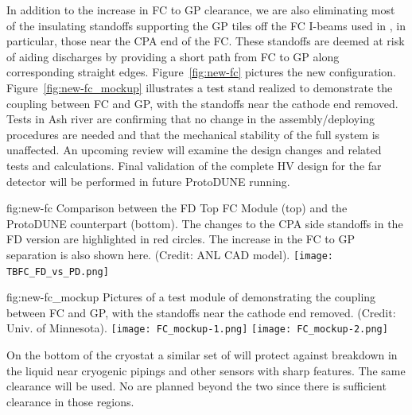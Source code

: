 In addition to the increase in FC to GP clearance, we are also eliminating most of the insulating standoffs supporting the GP tiles off the FC I-beams used in , in particular, those near the CPA end of the FC.  These standoffs  are deemed at risk of aiding discharges by providing a short path from FC to GP along corresponding straight edges.  Figure~\ref{fig:new-fc} pictures the new configuration. Figure~\ref{fig:new-fc_mockup} illustrates a test stand realized to demonstrate the coupling between FC and GP, with the standoffs near the cathode end removed. Tests in Ash river are confirming that no change in the assembly/deploying procedures are needed and that the mechanical stability of the full system is unaffected. An upcoming review will examine the design changes and related tests and calculations. Final validation of the complete HV design for the far detector will be performed in future ProtoDUNE running.

\begin{dunefigure}
{fig:new-fc}
{Comparison between the FD Top FC Module (top) and the ProtoDUNE counterpart (bottom).  The changes to the CPA side standoffs in the FD version are highlighted in red circles.  The increase in the FC to GP separation is also shown here. (Credit: ANL CAD model).}%
\texttt{[image: TBFC\_FD\_vs\_PD.png]}
\end{dunefigure}

\begin{dunefigure}
{fig:new-fc_mockup}
{Pictures of a test module of demonstrating the coupling between FC and GP, with the standoffs near the cathode end removed. (Credit: Univ. of Minnesota).}%
\texttt{[image: FC\_mockup-1.png]}
\texttt{[image: FC\_mockup-2.png]}
\end{dunefigure}

On the bottom of the cryostat a similar set of  %
will protect against %
breakdown in the liquid near cryogenic pipings and other sensors with sharp features. The same clearance will be used. No  are planned beyond the two  since there is sufficient clearance in those regions.  


